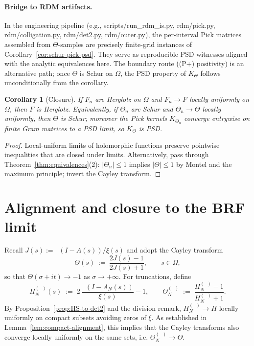 \documentclass[11pt]{article}
\newtheorem{corollary}[theorem]{Corollary}
\theoremstyle{remark}
\DeclareMathOperator{\dettwo}{det_2}
\begin{document}
\paragraph{Bridge to RDM artifacts.}
In the engineering pipeline (e.g., scripts/run\_rdm\_is.py, rdm/pick.py, rdm/colligation.py, rdm/det2.py, rdm/outer.py), the per-interval Pick matrices assembled from \(\Theta\)-samples are precisely finite-grid instances of Corollary~\ref{cor:schur-pick-psd}. They serve as reproducible PSD witnesses aligned with the analytic equivalences here. The boundary route ((P+) positivity) is an alternative path; once \(\Theta\) is Schur on \(\Omega\), the PSD property of \(K_\Theta\) follows unconditionally from the corollary.

\begin{corollary}[Closure]\label{cor:closure}
If \(F_n\) are Herglotz on \(\Omega\) and \(F_n\to F\) locally uniformly on \(\Omega\), then \(F\) is Herglotz. Equivalently, if \(\Theta_n\) are Schur and \(\Theta_n\to\Theta\) locally uniformly, then \(\Theta\) is Schur; moreover the Pick kernels \(K_{\Theta_n}\) converge entrywise on finite Gram matrices to a PSD limit, so \(K_{\Theta}\) is PSD.
\end{corollary}
\begin{proof}
Local-uniform limits of holomorphic functions preserve pointwise inequalities that are closed under limits. Alternatively, pass through Theorem~\ref{thm:equivalences}(2): \(|\Theta_n|\le 1\) implies \(|\Theta|\le 1\) by Montel and the maximum principle; invert the Cayley transform.
\end{proof}

\section{Alignment and closure to the BRF limit}\label{sec:alignment}
Recall \(J(s):=\dettwo(I-A(s))/\xi(s)\) and adopt the Cayley transform
\[
  \Theta(s)\ :=\ \frac{2J(s)-1}{2J(s)+1},\qquad s\in\Omega,
\]
so that \(\Theta(\sigma+it)\to -1\) as \(\sigma\to+\infty\). For truncations, define
\[
 H_N^{(\dettwo)}(s)\;:=\;2\,\frac{\dettwo(I-A_N(s))}{\xi(s)}-1,\qquad \Theta_N^{(\dettwo)}\;:=\;\frac{H_N^{(\dettwo)}-1}{H_N^{(\dettwo)}+1}.
\]
By Proposition~\ref{prop:HS-to-det2} and the division remark, \(H_N^{(\dettwo)}\to H\) locally uniformly on compact subsets avoiding zeros of \(\xi\). As established in Lemma~\ref{lem:compact-alignment}, this implies that the Cayley transforms also converge locally uniformly on the same sets, i.e. \(\Theta_N^{(\dettwo)}\to\Theta\).
\end{document}
